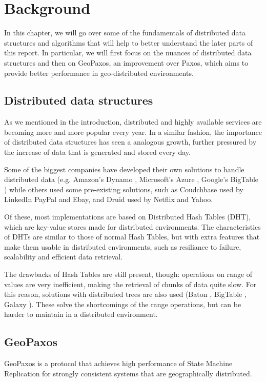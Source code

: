 \chapter{Background}\label{sec:Background}
In this chapter, we will go over some of the fundamentals of distributed data structures and algorithms that will help to better understand the later parts of this report. In particular, we will first focus on the nuances of distributed data structures and then on  GeoPaxos, an improvement over Paxos, which aims to provide better performance in geo-distributed environments.

\section{Distributed data structures}\label{sec:distributed-data-structures}
As we mentioned in the introduction, distributed and highly available services are becoming more and more popular every year. In a similar fashion, the importance of distributed data structures has seen a analogous growth, further pressured by the increase of data that is generated and stored every day. 

Some of the biggest companies have developed their own solutions to handle distributed data (e.g. Amazon's Dynamo \citep{dynamo}, Microsoft's Azure \citep{azure}, Google's BigTable \citep{bigtable}) while others used some pre-existing solutions, such as Coudchbase \citep{couchbase} used by LinkedIn PayPal and Ebay, and Druid \citep{druid} used by Netflix and Yahoo. 

Of these, most implementations are based on Distributed Hash Tables (DHT), which are key-value stores made for distributed environments.
The characteristics of DHTs are similar to those of normal Hash Tables, but with extra features that make them usable in distributed environments, such as resiliance to failure, scalability and efficient data retrieval.

The drawbacks of Hash Tables are still present, though: operations on range of values are very inefficient, making the retrieval of chunks of data quite slow. For this reason, solutions with distributed trees are also used (Baton \citep{baton}, BigTable \citep{bigtable}, Galaxy \citep{galaxy}). These solve the shortcomings of the range operations, but can be harder to maintain in a distributed environment. 

\section{GeoPaxos}\label{sec:GeoPaxos}
GeoPaxos is a protocol that achieves high performance of State Machine Replication for strongly consistent systems that are geographically distributed.

